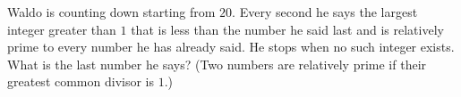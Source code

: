 Waldo is counting down starting from $20$. Every second he says the largest integer greater than $1$ that is less than the number he said last and is relatively prime to every number he has already said. He stops when no such integer exists. What is the last number he says? (Two numbers are relatively prime if their greatest common divisor is $1$.)
